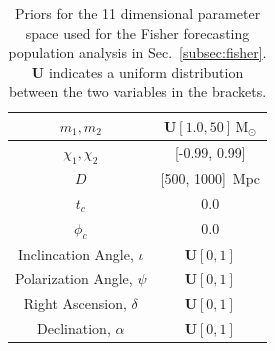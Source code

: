 \documentclass[twocolumn]{aastex631}
\begin{document}

\begin{table}[t!]
    \centering
    \begin{tabular}{c|c}
    \hline\hline
    $m_1, m_2$ & $\boldsymbol{U}[1.0, 50]\, \mathrm{M}_\odot$ \\ \hline
    $\chi_1, \chi_2$ & [-0.99, 0.99] \\ \hline
    $D$ & [500, 1000]\, Mpc \\ \hline
    $t_c$ & 0.0 \\ \hline
    $\phi_c$ & 0.0 \\ \hline
    Inclincation Angle, $\iota$ & $\boldsymbol{U}[0, 1]$ \\ \hline
    Polarization Angle, $\psi$ & $\boldsymbol{U}[0, 1]$ \\ \hline
    Right Ascension, $\delta$ & $\boldsymbol{U}[0, 1]$ \\ \hline
    Declination, $\alpha$ & $\boldsymbol{U}[0, 1]$ \\ 
    \hline\hline
    \end{tabular}
    \caption{Priors for the 11 dimensional parameter space used for the Fisher forecasting population analysis in Sec.~\ref{subsec:fisher}. 
    $\boldsymbol{U}$ indicates a uniform distribution between the two variables in the brackets.}
    \label{tab:priors}
\end{table}
\end{document}
